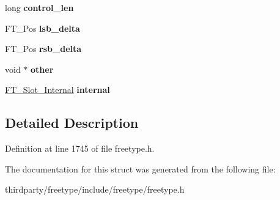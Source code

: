 \begin{DoxyCompactItemize}
long {\bfseries control\+\_\+len}
\item 
\mbox{\label{struct_f_t___glyph_slot_rec___a7d0d8c2eda28e38541e953186ecab89a}} 
F\+T\+\_\+\+Pos {\bfseries lsb\+\_\+delta}
\item 
\mbox{\label{struct_f_t___glyph_slot_rec___a2ca5f5e7b92df3aee4584949fa6a2a1c}} 
F\+T\+\_\+\+Pos {\bfseries rsb\+\_\+delta}
\item 
\mbox{\label{struct_f_t___glyph_slot_rec___ad0c5ab51842f178ba571bab2874f1bdb}} 
void $\ast$ {\bfseries other}
\item 
\mbox{\label{struct_f_t___glyph_slot_rec___a91731fd527eeab1d1acf3e1aea4bea84}} 
\hyperlink{struct_f_t___slot___internal_rec__}{F\+T\+\_\+\+Slot\+\_\+\+Internal} {\bfseries internal}
\end{DoxyCompactItemize}


\subsection{Detailed Description}


Definition at line 1745 of file freetype.\+h.



The documentation for this struct was generated from the following file\+:\begin{DoxyCompactItemize}
\item 
thirdparty/freetype/include/freetype/freetype.\+h\end{DoxyCompactItemize}
